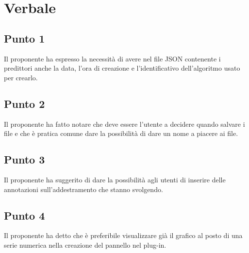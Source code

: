\section{Verbale}
    \subsection{Punto 1}
        Il proponente ha espresso la necessità di avere nel file JSON contenente i predittori anche la data, l'ora di creazione e l'identificativo dell'algoritmo usato per crearlo.
    \subsection{Punto 2}
        Il proponente ha fatto notare che deve essere l'utente a decidere quando salvare i file e che è pratica comune dare la possibilità di dare un nome a piacere ai file.
    \subsection{Punto 3}
        Il proponente ha suggerito di dare la possibilità agli utenti di inserire delle annotazioni sull'addestramento che stanno svolgendo.
    \subsection{Punto 4}
        Il proponente ha detto che è preferibile visualizzare già il grafico al posto di una serie numerica nella creazione del pannello nel plug-in. 
     
        